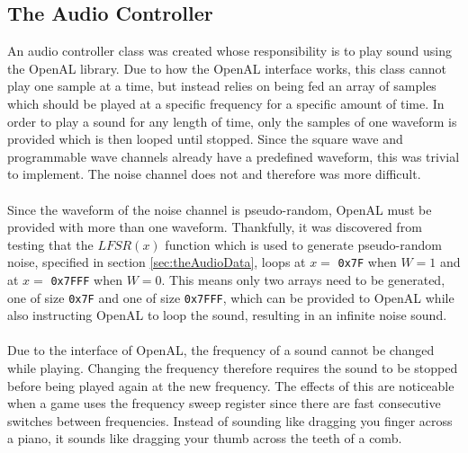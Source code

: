 \subsection{The Audio Controller}
An audio controller class was created whose responsibility is to play sound using the OpenAL library. Due to how the OpenAL interface works, this class cannot play one sample at a time, but instead relies on being fed an array of samples which should be played at a specific frequency for a specific amount of time. In order to play a sound for any length of time, only the samples of one waveform is provided which is then looped until stopped. Since the square wave and programmable wave channels already have a predefined waveform, this was trivial to implement. The noise channel does not and therefore was more difficult.
\\\\
Since the waveform of the noise channel is pseudo-random, OpenAL must be provided with more than one waveform. Thankfully, it was discovered from testing that the $LFSR(x)$ function which is used to generate pseudo-random noise, specified in section \ref{sec:theAudioData}, loops at $x = $ \texttt{0x7F} when $W = 1$ and at $x = $ \texttt{0x7FFF} when $W = 0$. This means only two arrays need to be generated, one of size \texttt{0x7F} and one of size \texttt{0x7FFF}, which can be provided to OpenAL while also instructing OpenAL to loop the sound, resulting in an infinite noise sound.
\\\\
Due to the interface of OpenAL, the frequency of a sound cannot be changed while playing. Changing the frequency therefore requires the sound to be stopped before being played again at the new frequency. The effects of this are noticeable when a game uses the frequency sweep register since there are fast consecutive switches between frequencies. Instead of sounding like dragging you finger across a piano, it sounds like dragging your thumb across the teeth of a comb.

